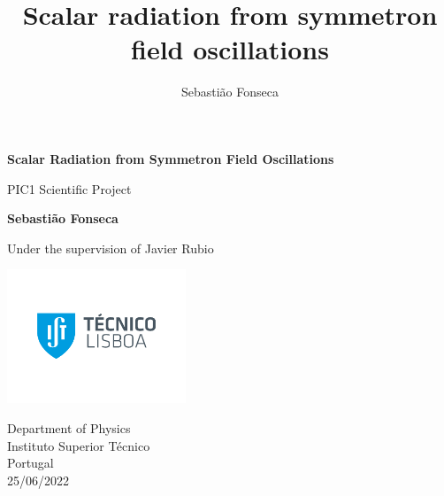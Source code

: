 \documentclass[nofootinbib,twocolumn]{revtex4}
\begin{document}
\begin{titlepage}
   \begin{center}
       \vspace*{1cm}

       \LARGE\textbf{Scalar Radiation from Symmetron Field Oscillations}

       \vspace{0.5cm}
        \normalsize PIC1 Scientific Project
            
       \vspace{1.5cm}

       \large \textbf{Sebastião Fonseca}

       \vfill
            
       \normalsize Under the supervision of Javier Rubio
            
       \vspace{10cm}
     
       \includegraphics[width=0.4\textwidth]{Images/ist.png}
       
            
       Department of Physics\\
       Instituto Superior Técnico\\
       Portugal\\
       25/06/2022
       
       \vspace{5cm}
       

   \end{center}
\end{titlepage}

\title{\large \bf  Scalar radiation from symmetron field oscillations}
\author{Sebastião Fonseca}
\end{document}
